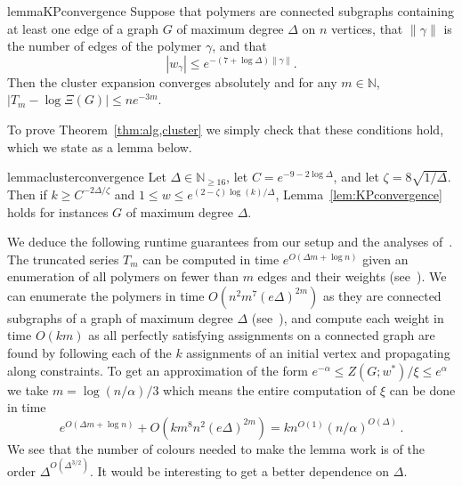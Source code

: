 %
\begin{restatable}{lemma}{KPconvergence}\label{lem:KPconvergence}
Suppose that polymers are connected subgraphs containing at least one edge of a graph $G$ of maximum degree $\Delta$ on $n$ vertices, that $\|\gamma\|$ is the number of edges of the polymer $\gamma$, and that
\begin{equation}|w_\gamma|\leq e^{-(7+\log\Delta)\|\gamma\|}.\label{eq:ce 2}\end{equation}
Then the cluster expansion converges absolutely and for any $m\in\mathbb N$, $|T_m-\log\Xi(G)|\leq ne^{-3m}$.
\end{restatable}

%
\noindent
To prove Theorem~\ref{thm:alg,cluster} we simply check that these conditions hold, which we state as a lemma below. 
%
\begin{restatable}{lemma}{clusterconvergence}\label{lem:clusterconvergence}
Let $\Delta\in \mathbb{N}_{\geq 16}$, let $C=e^{-9-2\log\Delta}$, and let $\zeta= 8\sqrt{1/\Delta}$.
Then if $k\geq C^{-2\Delta/\zeta}$ and $1\leq w\leq e^{(2-\zeta)\log(k)/\Delta}$, Lemma~\ref{lem:KPconvergence} holds for \UG[k] instances $G$ of maximum degree $\Delta$.
\end{restatable}
%

%
We deduce the following runtime guarantees from our setup and the analyses of~\cite{HPR19,PR17}.
The truncated series $T_m$ can be computed in time $e^{O(\Delta m+\log n)}$ given an enumeration of all polymers on fewer than $m$ edges and their weights (see~\cite{HPR19}). 
We can enumerate the polymers in time $O(n^2m^7(e\Delta)^{2m})$ as they are connected subgraphs of a graph of maximum degree $\Delta$ (see~\cite{PR17}), and compute each weight in time $O(km)$ as all perfectly satisfying assignments on a connected graph are found by following each of the $k$ assignments of an initial vertex and propagating along constraints.
To get an approximation of the form $e^{-\alpha}\le Z(G;w^*)/\xi\le e^\alpha$ we take $m=\log(n/\alpha)/3$ which means the entire computation of $\xi$ can be done in time
\[
e^{O(\Delta m+\log n)} + O(km^8n^2(e\Delta)^{2m})= kn^{O(1)}(n/\alpha)^{O(\Delta)}\,.
\]
We see that the number of colours needed to make the lemma work is of the order $\Delta^{O(\Delta^{3/2})}$. It would be interesting to get a better dependence on $\Delta$.
%
%
